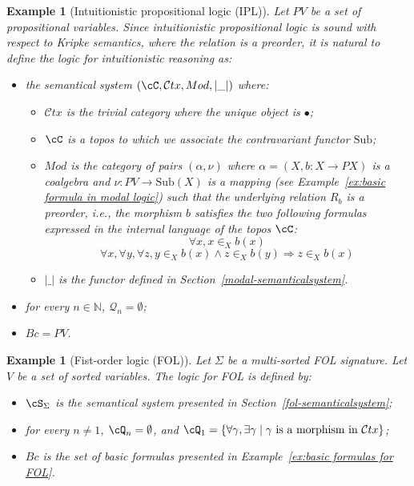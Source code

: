 \documentclass[preprint,3p,times]{elsarticle}
\newtheorem{example}[definition]{Example}
\newcommand{\Sub}{\mathrm{Sub}}
\newcommand{\Ctx}{\mathcal{C}tx}
\begin{document}
\begin{example}[Intuitionistic propositional logic (IPL)]
\label{ex:intuitionistic propositional logic}
Let $PV$ be a set of propositional variables. Since intuitionistic propositional logic is sound with respect to Kripke semantics, where the relation is a preorder, it is natural to define the logic for intuitionistic reasoning as:
\begin{itemize}
    \item the semantical system $(\cC,\Ctx,Mod,|\_|)$ where:
    \begin{itemize}
        \item $\Ctx$ is the trivial category where the unique object is $\bullet$;
        \item $\cC$ is a topos to which we associate the contravariant functor $\Sub$;
        \item $Mod$ is the category of pairs $(\alpha,\nu)$ where $\alpha = (X,b:X \to PX)$ is a coalgebra and $\nu : PV \to \Sub(X)$ is a mapping (see Example~\ref{ex:basic formula in modal logic}) such that the underlying relation $R_b$ is a preorder, i.e., the morphism $b$ satisfies the two following formulas expressed in the internal language of the topos $\cC$:        
        \[
            \forall x,x \in_X b(x)
        \]
        \[
            \forall x,\forall y,\forall z, y \in_X b(x) \wedge z \in_X b(y) \Rightarrow z \in_X b(x)
        \]
        \item $|\_|$ is the functor defined in Section~\ref{modal-semanticalsystem}.
    \end{itemize}
    \item for every $n \in \mathbb{N}$, $\mathcal{Q}_n = \emptyset$;
    \item $Bc = PV$.
\end{itemize}
\end{example}

\begin{example}[Fist-order logic (FOL)]
\label{ex:FOL logic}
Let $\Sigma$ be a multi-sorted FOL signature. Let $V$ be a set of sorted variables. The logic for FOL is defined by:
\begin{itemize}
    \item $\cS_\Sigma$ is the semantical system presented in Section~\ref{fol-semanticalsystem};
    \item for every $n \neq 1$, $\cQ_n = \emptyset$, and $\cQ_1 = \{\forall \gamma,\exists \gamma \mid \gamma~\mbox{is a morphism in}~\Ctx\}$;
    \item $Bc$ is the set of basic formulas presented in Example~\ref{ex:basic formulas for FOL}.
\end{itemize}
\end{example}
\end{document}
